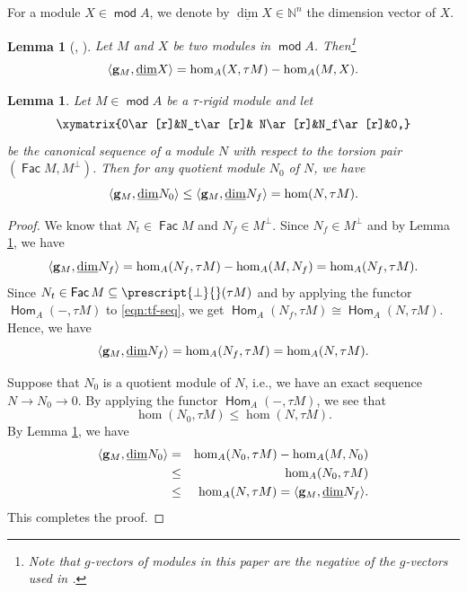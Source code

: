 \documentclass[10pt]{amsart}
\newtheorem{lemma}[theorem]{Lemma}
\theoremstyle{definition}
\theoremstyle{remark}
\numberwithin{equation}{section}
\def\mod{\opname{mod}\nolimits}
\newcommand{\opname}[1]{\operatorname{\mathsf{#1}}}
\newcommand{\Fac}{\opname{Fac}}
\newcommand{\Hom}{\opname{Hom}}
\begin{document}
For a module $X\in\mod A$, we denote by $\underline{\dim} X\in\mathbb N^n$ the dimension vector of $X$.

\begin{lemma}[{\cite[Prop. 2.4]{air_2014}}, {\cite[Thm. 1.4]{AR-1985}}] \label{lem:g-MX}
 Let $M$ and $X$ be two modules in $\mod A$. Then\footnote{Note that $g$-vectors of modules in this paper are the negative of the $g$-vectors used in \cite{air_2014}.} 
 \[ \langle {\bf g}_M, \underline{\dim} X\rangle=\hom_A(X,\tau M)-\hom_A(M, X).
 \]
\end{lemma}

\begin{lemma}\label{lem:N0-Nf}
Let $M\in\mod A$ be a $\tau$-rigid module and let \begin{eqnarray}\label{eqn:tf-seq}
    \xymatrix{0\ar[r]&N_t\ar[r]& N\ar[r]&N_f\ar[r]&0,}
\end{eqnarray}
be the canonical sequence of a module $N$ with respect to the torsion pair  $(\Fac M, M^\bot)$. Then  for any quotient module $N_0$ of $N$, we have 
\[
\langle {\bf g}_M, \underline{\dim} N_0\rangle\leq \langle{\bf g}_M, \underline{\dim} N_f\rangle=
 \hom(N,\tau M).
\]
\end{lemma}

\begin{proof}
 We know that $N_t\in\Fac M$ and $N_f\in M^{\bot}$.  Since $N_f\in M^{\bot}$ and by Lemma \ref{lem:g-MX}, we have
\[\langle {\bf g}_M, \underline{\dim} N_f\rangle=\hom_A(N_f,\tau M)-\hom_A(M,N_f)=\hom_A(N_f,\tau M).\]
Since $N_t\in \Fac M\subseteq \prescript{\bot}{}(\tau M)$ and by applying the functor $\Hom_A(-,\tau M)$ to \eqref{eqn:tf-seq}, we get $\Hom_A(N_f,\tau M)\cong \Hom_A(N,\tau M)$. Hence, we have 
\[\langle {\bf g}_M,\underline{\dim} N_f\rangle=\hom_A(N_f,\tau M)=\hom_A(N,\tau M).\]

Suppose that $N_0$ is a quotient module of $N$, i.e., we have an exact sequence $N\to N_0\to 0$. By applying the functor $\Hom_A(-,\tau M)$, we see that 
\[ \hom(N_0,\tau M)\leq \hom(N,\tau M).\]
By Lemma \ref{lem:g-MX}, we have
\begin{eqnarray*}\label{eqn:N0-Nf}
    \langle {\bf g}_M, \underline{\dim} N_0\rangle&=&\hom_A(N_0,\tau M)-\hom_A(M,N_0)\\
    &\leq& \hom_A(N_0,\tau M) \\
    &\leq&  \hom_A(N,\tau M)=\langle{\bf g}_M, \underline{\dim} N_f\rangle.
\end{eqnarray*}
This completes the proof.
\end{proof}
\end{document}
